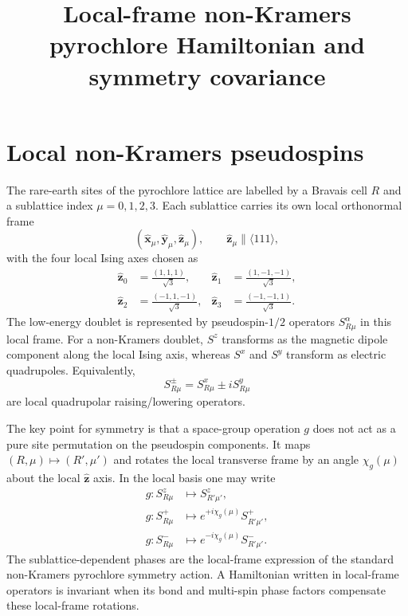 \documentclass[11pt]{article}
\begin{document}
\title{Local-frame non-Kramers pyrochlore Hamiltonian and symmetry covariance}
\author{}
\date{}
\maketitle

\section{Local non-Kramers pseudospins}

The rare-earth sites of the pyrochlore lattice are labelled by a Bravais cell
$R$ and a sublattice index $\mu=0,1,2,3$.  Each sublattice carries its own
local orthonormal frame
\begin{equation}
  \left(\hat{\bm x}_{\mu},\hat{\bm y}_{\mu},\hat{\bm z}_{\mu}\right),
  \qquad
  \hat{\bm z}_{\mu}\parallel \langle 111\rangle ,
\end{equation}
with the four local Ising axes chosen as
\begin{equation}
\begin{aligned}
  \hat{\bm z}_0 &= \frac{(1,1,1)}{\sqrt 3},&
  \hat{\bm z}_1 &= \frac{(1,-1,-1)}{\sqrt 3},\\
  \hat{\bm z}_2 &= \frac{(-1,1,-1)}{\sqrt 3},&
  \hat{\bm z}_3 &= \frac{(-1,-1,1)}{\sqrt 3}.
\end{aligned}
\end{equation}
The low-energy doublet is represented by pseudospin-$1/2$ operators
$S^\alpha_{R\mu}$ in this local frame.  For a non-Kramers doublet,
$S^z$ transforms as the magnetic dipole component along the local Ising axis,
whereas $S^x$ and $S^y$ transform as electric quadrupoles.  Equivalently,
\begin{equation}
  S^\pm_{R\mu}=S^x_{R\mu}\pm iS^y_{R\mu}
\end{equation}
are local quadrupolar raising/lowering operators.

The key point for symmetry is that a space-group operation $g$ does not act as
a pure site permutation on the pseudospin components.  It maps
$(R,\mu)\mapsto (R',\mu')$ and rotates the local transverse frame by an angle
$\chi_g(\mu)$ about the local $\hat{\bm z}$ axis.  In the local basis one may
write
\begin{equation}
\begin{aligned}
  g: S^z_{R\mu} &\mapsto S^z_{R'\mu'},\\
  g: S^+_{R\mu} &\mapsto e^{+i\chi_g(\mu)} S^+_{R'\mu'},\\
  g: S^-_{R\mu} &\mapsto e^{-i\chi_g(\mu)} S^-_{R'\mu'}.
\end{aligned}
\label{eq:local-frame-transform}
\end{equation}
The sublattice-dependent phases are the local-frame expression of the
standard non-Kramers pyrochlore symmetry action.  A Hamiltonian written in
local-frame operators is invariant when its bond and multi-spin phase factors
compensate these local-frame rotations.
\end{document}
